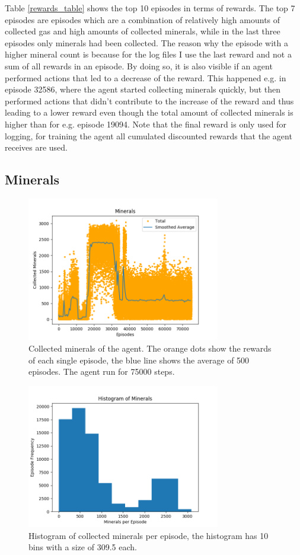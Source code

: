 \documentclass{article}
\begin{document}
Table \ref{rewards_table} shows the top 10 episodes in terms of rewards. The 
top 7 episodes are episodes which are a combination of relatively high amounts 
of collected gas and high amounts of collected minerals, while in the last 
three episodes only minerals had been collected. The reason why the episode 
with a higher mineral count is because for the log files I use the last reward 
and not a sum of all rewards in an episode. By doing so, it is also visible if 
an agent performed actions that led to a decrease of the reward. This happened 
e.g. in episode 32586, where the agent started collecting minerals quickly, but 
then performed actions that didn't contribute to the increase of the reward and 
thus leading to a lower reward even though the total amount of collected 
minerals is higher than for e.g. episode 19094. Note that the final reward is 
only used for logging, for training the agent all cumulated discounted rewards 
that the agent receives are used.

\subsection{Minerals}
\begin{figure}
\includegraphics[width=0.75\textwidth]{minerals.png}
\caption{Collected minerals of the agent. The orange dots show the rewards of 
each single episode, the blue line shows the average of 500 episodes. The agent 
run for 75000 steps.}
\label{minerals}
\end{figure}

\begin{figure}
\includegraphics[width=0.75\textwidth]{minerals_histogram.png}
\caption{Histogram of collected minerals per episode, the histogram has 10 bins 
with a  size of 309.5 each.}
\label{minerals_histogram}
\end{figure}
\end{document}
